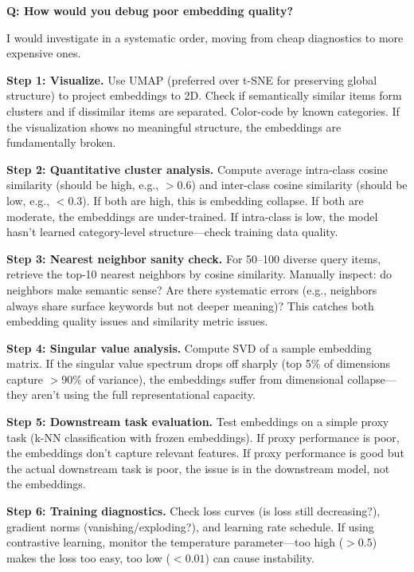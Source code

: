 
\begin{interviewq}
\textbf{Q: How would you debug poor embedding quality?}

 \quad {} \quad \badgefreq{\freqhigh}

\stronganswer

I would investigate in a systematic order, moving from cheap diagnostics to more expensive ones.

\textbf{Step 1: Visualize.} Use UMAP (preferred over t-SNE for preserving global structure) to project embeddings to 2D. Check if semantically similar items form clusters and if dissimilar items are separated. Color-code by known categories. If the visualization shows no meaningful structure, the embeddings are fundamentally broken.

\textbf{Step 2: Quantitative cluster analysis.} Compute average intra-class cosine similarity (should be high, e.g., $>0.6$) and inter-class cosine similarity (should be low, e.g., $<0.3$). If both are high, this is embedding collapse. If both are moderate, the embeddings are under-trained. If intra-class is low, the model hasn't learned category-level structure---check training data quality.

\textbf{Step 3: Nearest neighbor sanity check.} For 50--100 diverse query items, retrieve the top-10 nearest neighbors by cosine similarity. Manually inspect: do neighbors make semantic sense? Are there systematic errors (e.g., neighbors always share surface keywords but not deeper meaning)? This catches both embedding quality issues and similarity metric issues.

\textbf{Step 4: Singular value analysis.} Compute SVD of a sample embedding matrix. If the singular value spectrum drops off sharply (top 5\% of dimensions capture $>90\%$ of variance), the embeddings suffer from dimensional collapse---they aren't using the full representational capacity.

\textbf{Step 5: Downstream task evaluation.} Test embeddings on a simple proxy task (k-NN classification with frozen embeddings). If proxy performance is poor, the embeddings don't capture relevant features. If proxy performance is good but the actual downstream task is poor, the issue is in the downstream model, not the embeddings.

\textbf{Step 6: Training diagnostics.} Check loss curves (is loss still decreasing?), gradient norms (vanishing/exploding?), and learning rate schedule. If using contrastive learning, monitor the temperature parameter---too high ($>0.5$) makes the loss too easy, too low ($<0.01$) can cause instability.


\end{interviewq}
